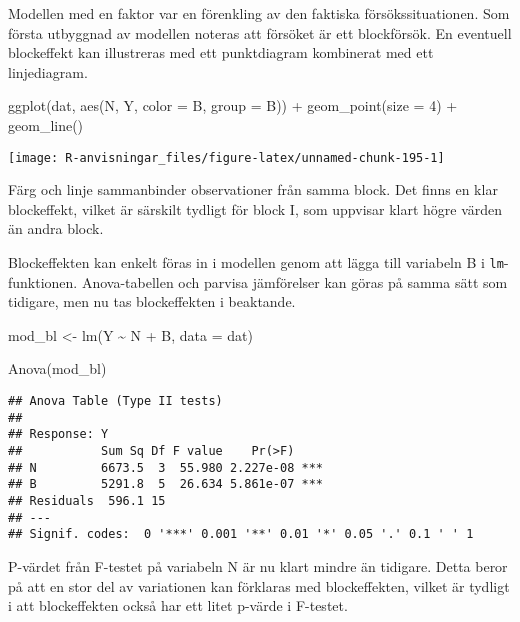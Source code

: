 \documentclass[
]{book}
\newenvironment{Shaded}{\begin{snugshade}}{\end{snugshade}}
\newcommand{\AttributeTok}[1]{\textcolor[rgb]{0.77,0.63,0.00}{#1}}
\newcommand{\DecValTok}[1]{\textcolor[rgb]{0.00,0.00,0.81}{#1}}
\newcommand{\FunctionTok}[1]{\textcolor[rgb]{0.00,0.00,0.00}{#1}}
\newcommand{\NormalTok}[1]{#1}
\newcommand{\OtherTok}[1]{\textcolor[rgb]{0.56,0.35,0.01}{#1}}
\newcommand{\SpecialCharTok}[1]{\textcolor[rgb]{0.00,0.00,0.00}{#1}}
\theoremstyle{definition}
\theoremstyle{definition}
\theoremstyle{definition}
\theoremstyle{definition}
\theoremstyle{remark}
\begin{document}
Modellen med en faktor var en förenkling av den faktiska försökssituationen. Som första utbyggnad av modellen noteras att försöket är ett blockförsök. En eventuell blockeffekt kan illustreras med ett punktdiagram kombinerat med ett linjediagram.

\begin{Shaded}
\begin{Highlighting}[]
\FunctionTok{ggplot}\NormalTok{(dat, }\FunctionTok{aes}\NormalTok{(N, Y, }\AttributeTok{color =}\NormalTok{ B, }\AttributeTok{group =}\NormalTok{ B)) }\SpecialCharTok{+}
  \FunctionTok{geom\_point}\NormalTok{(}\AttributeTok{size =} \DecValTok{4}\NormalTok{) }\SpecialCharTok{+}
  \FunctionTok{geom\_line}\NormalTok{()}
\end{Highlighting}
\end{Shaded}

\begin{center}\texttt{[image: R-anvisningar\_files/figure-latex/unnamed-chunk-195-1]} \end{center}

Färg och linje sammanbinder observationer från samma block. Det finns en klar blockeffekt, vilket är särskilt tydligt för block I, som uppvisar klart högre värden än andra block.

Blockeffekten kan enkelt föras in i modellen genom att lägga till variabeln B i \texttt{lm}-funktionen. Anova-tabellen och parvisa jämförelser kan göras på samma sätt som tidigare, men nu tas blockeffekten i beaktande.

\begin{Shaded}
\begin{Highlighting}[]
\NormalTok{mod\_bl }\OtherTok{\textless{}{-}} \FunctionTok{lm}\NormalTok{(Y }\SpecialCharTok{\textasciitilde{}}\NormalTok{ N }\SpecialCharTok{+}\NormalTok{ B, }\AttributeTok{data =}\NormalTok{ dat)}

\FunctionTok{Anova}\NormalTok{(mod\_bl)}
\end{Highlighting}
\end{Shaded}

\begin{verbatim}
## Anova Table (Type II tests)
## 
## Response: Y
##           Sum Sq Df F value    Pr(>F)    
## N         6673.5  3  55.980 2.227e-08 ***
## B         5291.8  5  26.634 5.861e-07 ***
## Residuals  596.1 15                      
## ---
## Signif. codes:  0 '***' 0.001 '**' 0.01 '*' 0.05 '.' 0.1 ' ' 1
\end{verbatim}

P-värdet från F-testet på variabeln N är nu klart mindre än tidigare. Detta beror på att en stor del av variationen kan förklaras med blockeffekten, vilket är tydligt i att blockeffekten också har ett litet p-värde i F-testet.
\end{document}
